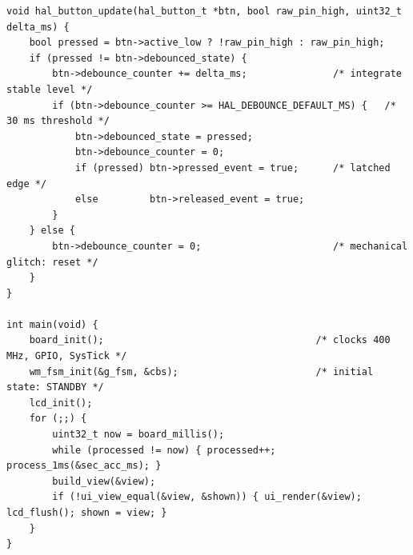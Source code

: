 \begin{lstlisting}[caption={Integrating debouncer and bare-metal super-loop}]
void hal_button_update(hal_button_t *btn, bool raw_pin_high, uint32_t delta_ms) {
    bool pressed = btn->active_low ? !raw_pin_high : raw_pin_high;
    if (pressed != btn->debounced_state) {
        btn->debounce_counter += delta_ms;               /* integrate stable level */
        if (btn->debounce_counter >= HAL_DEBOUNCE_DEFAULT_MS) {   /* 30 ms threshold */
            btn->debounced_state = pressed;
            btn->debounce_counter = 0;
            if (pressed) btn->pressed_event = true;      /* latched edge */
            else         btn->released_event = true;
        }
    } else {
        btn->debounce_counter = 0;                       /* mechanical glitch: reset */
    }
}

int main(void) {
    board_init();                                     /* clocks 400 MHz, GPIO, SysTick */
    wm_fsm_init(&g_fsm, &cbs);                        /* initial state: STANDBY */
    lcd_init();
    for (;;) {
        uint32_t now = board_millis();
        while (processed != now) { processed++; process_1ms(&sec_acc_ms); }
        build_view(&view);
        if (!ui_view_equal(&view, &shown)) { ui_render(&view); lcd_flush(); shown = view; }
    }
}
\end{lstlisting}

